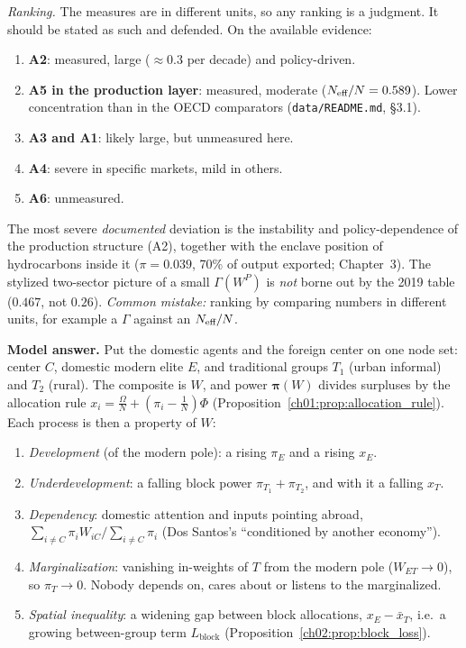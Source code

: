 \documentclass[../solutions_manual.tex]{subfiles}
\begin{document}
 \emph{Ranking.} The measures are in different units, so any ranking is a judgment. It should be stated as such and defended. On the available evidence:
\begin{enumerate}
\item \textbf{A2}: measured, large ($\approx 0.3$ per decade) and policy-driven.
\item \textbf{A5 in the production layer}: measured, moderate ($N_{\text{eff}}/N = 0.589$). Lower concentration than in the OECD comparators (\texttt{data/README.md}, \S3.1).
\item \textbf{A3 and A1}: likely large, but unmeasured here.
\item \textbf{A4}: severe in specific markets, mild in others.
\item \textbf{A6}: unmeasured.
\end{enumerate}
The most severe \emph{documented} deviation is the instability and policy-dependence of the production structure (A2), together with the enclave position of hydrocarbons inside it ($\pi = 0.039$, 70\% of output exported; Chapter~3). The stylized two-sector picture of a small $\Gamma(W^P)$ is \emph{not} borne out by the 2019 table ($0.467$, not $0.26$). \emph{Common mistake:} ranking by comparing numbers in different units, for example a $\Gamma$ against an $N_{\text{eff}}/N$.


\textbf{Model answer.} Put the domestic agents and the foreign center on one node set: center $C$, domestic modern elite $E$, and traditional groups $T_1$ (urban informal) and $T_2$ (rural). The composite is $W$, and power $\boldsymbol\pi(W)$ divides surpluses by the allocation rule $x_i = \frac{\Omega}{N} + (\pi_i - \frac1N)\Phi$ (Proposition~\ref{ch01:prop:allocation_rule}). Each process is then a property of $W$:
\begin{enumerate}
\item \emph{Development} (of the modern pole): a rising $\pi_E$ and a rising $x_E$.
\item \emph{Underdevelopment}: a falling block power $\pi_{T_1} + \pi_{T_2}$, and with it a falling $x_T$.
\item \emph{Dependency}: domestic attention and inputs pointing abroad, $\sum_{i\neq C}\pi_iW_{iC}/\sum_{i \ne C}\pi_i$ (Dos Santos's ``conditioned by another economy'').
\item \emph{Marginalization}: vanishing in-weights of $T$ from the modern pole ($W_{ET}\to0$), so $\pi_T \to 0$. Nobody depends on, cares about or listens to the marginalized.
\item \emph{Spatial inequality}: a widening gap between block allocations, $x_E - \bar x_T$, i.e.\ a growing between-group term $L_{\text{block}}$ (Proposition~\ref{ch02:prop:block_loss}).
\end{enumerate}
\end{document}
